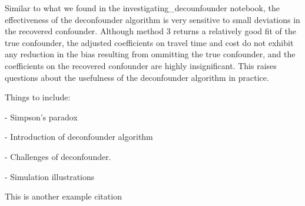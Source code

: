 Similar to what we found in the investigating_decounfounder notebook, the 
effectiveness of the deconfounder algorithm is very sensitive to small 
deviations in the recovered confounder. Although method 3 returns a relatively 
good fit of the true confounder, the adjusted coefficients on travel time and 
cost do not exhibit any reduction in the bias resulting from ommitting the 
true confounder, and the coefficients on the recovered confounder are highly 
insignificant. This raises questions about the usefulness of the deconfounder 
algorithm in practice.





Things to include:


- Simpson's paradox

- Introduction of deconfounder algorithm

- Challenges of deconfounder. 

- Simulation illustrations



\blindtext[2]

This is another example citation \cite{wang_2019_blessings}
